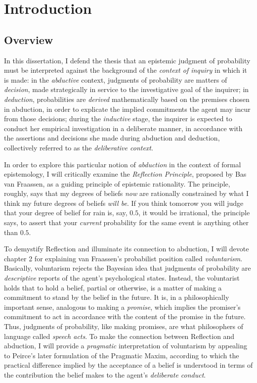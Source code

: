
\hypertarget{introduction}{%
\chapter{Introduction}\label{ch:introduction}}
\hypertarget{overview}{%
\section{Overview}\label{overview}}

In this dissertation, I defend the thesis that an epistemic judgment of
probability must be interpreted against the background of the
\emph{context of inquiry} in which it is made: in the \emph{abductive} context,
judgments of probability are matters of \emph{decision}, made
strategically in service to the investigative goal of the inquirer; in
\emph{deduction}, probabilities are \emph{derived} mathematically based on the
premises chosen in abduction, in order to explicate the implied
commitments the agent may incur from those decisions; during the
\emph{inductive} stage, the inquirer is expected to conduct her empirical
investigation in a deliberate manner, in accordance with the assertions and
decisions she made during abduction and deduction, collectively referred
to as the \emph{deliberative context}.

In order to explore this particular notion of \emph{abduction} in the
context of formal epistemology, I will critically examine the
\emph{Reflection Principle}, proposed by Bas van Fraassen, as a guiding
principle of epistemic rationality. The principle, roughly, says that my
degrees of beliefs \emph{now} are rationally constrained by what I think
my future degrees of beliefs \emph{will be}. If you think tomorrow you
will judge that your degree of belief for rain is, say, \(0.5\), it
would be irrational, the principle says, to assert that your \emph{current}
probability for the same event is anything other than \(0.5\).

To demystify Reflection and illuminate its connection to abduction, I
will devote chapter 2 for explaining van Fraassen's probabilist position
called \emph{voluntarism}. Basically, voluntarism rejects the Bayesian
idea that judgments of probability are \emph{descriptive} reports of the
agent's psychological states. Instead, the voluntarist holds that to hold
a belief, partial or otherwise, is a matter of making a commitment to
stand by the belief in the future. It is, in a philosophically important
sense, analogous to making a \emph{promise}, which implies the
promiser's commitment to act in accordance with the content of the promise in the future. Thus, judgments of probability, like making promises, are what philosophers of language called \emph{speech acts}. To make the connection
between Reflection and abduction, I will provide a \emph{pragmatic}
interpretation of voluntarism by appealing to Peirce's later
formulation of the Pragmatic Maxim, according to which the practical difference implied by the acceptance of a belief is understood in terms of the contribution the belief makes to the agent's \emph{deliberate conduct}.

